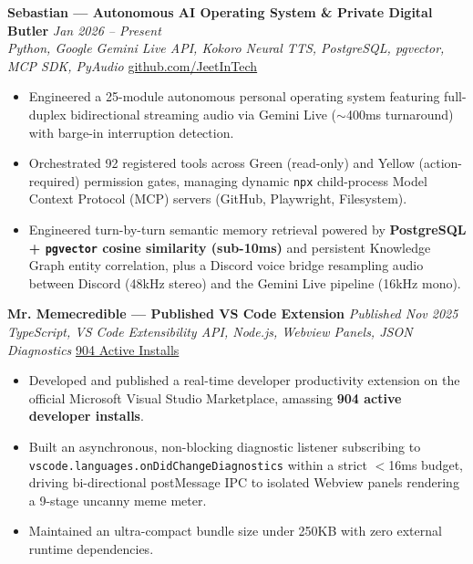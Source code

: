 \documentclass[9.5pt]{article}
\begin{document}
\vspace{2pt}
\textbf{Sebastian — Autonomous AI Operating System \& Private Digital Butler} \hfill \textit{Jan 2026 -- Present} \\
\textit{Python, Google Gemini Live API, Kokoro Neural TTS, PostgreSQL, pgvector, MCP SDK, PyAudio} \hfill \href{https://github.com/JeetInTech}{github.com/JeetInTech}
\begin{itemize}
  \item Engineered a 25-module autonomous personal operating system featuring full-duplex bidirectional streaming audio via Gemini Live ($\sim$400ms turnaround) with barge-in interruption detection.
  \item Orchestrated 92 registered tools across Green (read-only) and Yellow (action-required) permission gates, managing dynamic \texttt{npx} child-process Model Context Protocol (MCP) servers (GitHub, Playwright, Filesystem).
  \item Engineered turn-by-turn semantic memory retrieval powered by \textbf{PostgreSQL + \texttt{pgvector} cosine similarity (sub-10ms)} and persistent Knowledge Graph entity correlation, plus a Discord voice bridge resampling audio between Discord (48kHz stereo) and the Gemini Live pipeline (16kHz mono).
\end{itemize}

\vspace{2pt}
\textbf{Mr. Memecredible — Published VS Code Extension} \hfill \textit{Published Nov 2025} \\
\textit{TypeScript, VS Code Extensibility API, Node.js, Webview Panels, JSON Diagnostics} \hfill \href{https://marketplace.visualstudio.com/items?itemName=SangramjeetGhosh.mr-memecredible}{904 Active Installs}
\begin{itemize}
  \item Developed and published a real-time developer productivity extension on the official Microsoft Visual Studio Marketplace, amassing \textbf{904 active developer installs}.
  \item Built an asynchronous, non-blocking diagnostic listener subscribing to \texttt{vscode.languages.onDidChangeDiagnostics} within a strict $<$16ms budget, driving bi-directional postMessage IPC to isolated Webview panels rendering a 9-stage uncanny meme meter.
  \item Maintained an ultra-compact bundle size under 250KB with zero external runtime dependencies.
\end{itemize}
\end{document}

